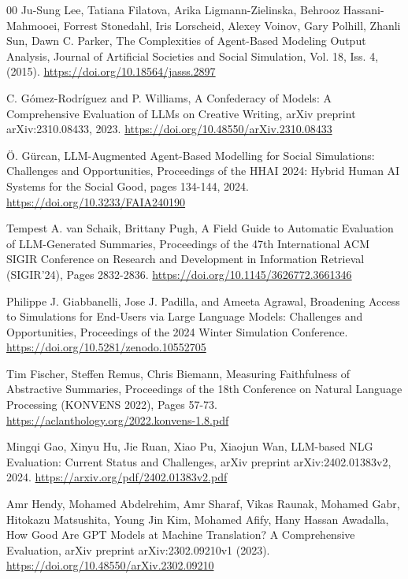 \documentclass[preprint,12pt]{elsarticle}
\begin{document}
\begin{thebibliography}{00}
Ju-Sung Lee, Tatiana Filatova, Arika Ligmann-Zielinska, Behrooz Hassani-Mahmooei, Forrest Stonedahl, Iris Lorscheid, Alexey Voinov, Gary Polhill, Zhanli Sun, Dawn C. Parker,
The Complexities of Agent-Based Modeling Output Analysis,
Journal of Artificial Societies and Social Simulation, Vol. 18, Iss. 4, (2015).
\href{https://doi.org/10.18564/jasss.2897}{https://doi.org/10.18564/jasss.2897}


C. Gómez-Rodríguez and P. Williams,
A Confederacy of Models: A Comprehensive Evaluation of LLMs on Creative Writing,
arXiv preprint arXiv:2310.08433,
2023.
\href{https://doi.org/10.48550/arXiv.2310.08433}{https://doi.org/10.48550/arXiv.2310.08433}

Ö. Gürcan,
LLM-Augmented Agent-Based Modelling for Social Simulations: Challenges and Opportunities,
Proceedings of the HHAI 2024: Hybrid Human AI Systems for the Social Good, pages 134-144,
2024.
\href{https://doi.org/10.3233/FAIA240190}{https://doi.org/10.3233/FAIA240190}

Tempest A. van Schaik, Brittany Pugh,
A Field Guide to Automatic Evaluation of LLM-Generated Summaries,
Proceedings of the 47th International ACM SIGIR Conference on Research and Development in Information Retrieval (SIGIR’24), Pages 2832-2836.
\href{https://doi.org/10.1145/3626772.3661346}{https://doi.org/10.1145/3626772.3661346}


Philippe J. Giabbanelli, Jose J. Padilla, and Ameeta Agrawal,
Broadening Access to Simulations for End-Users via Large Language Models: Challenges and Opportunities,
Proceedings of the 2024 Winter Simulation Conference.
\href{https://doi.org/10.5281/zenodo.10552705}{https://doi.org/10.5281/zenodo.10552705}


Tim Fischer, Steffen Remus, Chris Biemann,
Measuring Faithfulness of Abstractive Summaries,
Proceedings of the 18th Conference on Natural Language Processing (KONVENS 2022), Pages 57-73.
\href{https://aclanthology.org/2022.konvens-1.8.pdf}{https://aclanthology.org/2022.konvens-1.8.pdf}

Mingqi Gao, Xinyu Hu, Jie Ruan, Xiao Pu, Xiaojun Wan,
LLM-based NLG Evaluation: Current Status and Challenges,
arXiv preprint arXiv:2402.01383v2, 2024.
\href{https://arxiv.org/pdf/2402.01383v2.pdf}{https://arxiv.org/pdf/2402.01383v2.pdf}


Amr Hendy, Mohamed Abdelrehim, Amr Sharaf, Vikas Raunak, Mohamed Gabr, Hitokazu Matsushita, Young Jin Kim, Mohamed Afify, Hany Hassan Awadalla,
How Good Are GPT Models at Machine Translation? A Comprehensive Evaluation,
arXiv preprint arXiv:2302.09210v1 (2023).
\href{https://doi.org/10.48550/arXiv.2302.09210}{https://doi.org/10.48550/arXiv.2302.09210}


\end{thebibliography}
\end{document}
